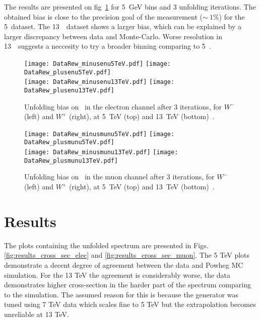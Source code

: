 The results are presented on fig~\ref{fig:BiasResultLargeBins} for 5~GeV bins and 3 unfolding iterations. The obtained bias is close to the precision goal of the measurement ($\sim~1\%$) for the 5~\TeV dataset. The 13~\TeV\ dataset shows a larger bias, which can be explained by a larger discrepancy between data and Monte-Carlo. Worse resolution in 13~\TeV\ suggests a neccesity to try a broader binning comparing to 5~\GeV.

\begin{figure}[h]
	\centering
	{\texttt{[image: DataRew\_minusenu5TeV.pdf]}}
	{\texttt{[image: DataRew\_plusenu5TeV.pdf]}}\\
	{\texttt{[image: DataRew\_minusenu13TeV.pdf]}}
	{\texttt{[image: DataRew\_plusenu13TeV.pdf]}}
	\caption{Unfolding bias on \ptw\ in the electron channel after 3 iterations, for $W^-$ (left) and $W^+$ (right), at 5~TeV (top) and 13~TeV (bottom)~\cite{int_note_1}.}
	\label{fig:BiasResultLargeBins}
\end{figure}

\begin{figure}[h]
	\centering
	{\texttt{[image: DataRew\_minusmunu5TeV.pdf]}}
	{\texttt{[image: DataRew\_plusmunu5TeV.pdf]}}\\
	{\texttt{[image: DataRew\_minusmunu13TeV.pdf]}}
	{\texttt{[image: DataRew\_plusmunu13TeV.pdf]}}
	\caption{Unfolding bias on \ptw\ in the muon channel after 3 iterations, for $W^-$ (left) and $W^+$ (right), at 5~TeV (top) and 13~TeV (bottom)~\cite{int_note_1}.}
	\label{fig:BiasResultLargeBins_mu}
\end{figure}
\clearpage



\section{Results}

The plots containing the unfolded spectrum are presented in Figs. \ref{fig:results_cross_sec_elec} and \ref{fig:results_cross_sec_muon}. The 5 TeV plots demonstrate a decent degree of agreement between the data and Powheg MC simulation. For the 13 TeV the agreement is considerably worse, the data demonstrates higher cross-section in the harder part of the spectrum comparing to the simulation.  The assumed reason for this is because the generator was tuned using 7 TeV data which scales fine to 5 TeV but the extrapolation becomes unreliable at 13 TeV.

